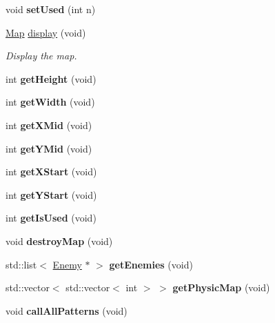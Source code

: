 \begin{DoxyCompactItemize}
\item 
\hypertarget{class_map_a65e629556c23b331cb085e4fdb079e29}{void {\bfseries set\+Used} (int n)}\label{class_map_a65e629556c23b331cb085e4fdb079e29}

\item 
\hyperlink{class_map}{Map} \hyperlink{class_map_a1a6c8bd5dc92c36e7054158d0fcb749b}{display} (void)
\begin{DoxyCompactList}\small\item\em Display the map. \end{DoxyCompactList}\item 
\hypertarget{class_map_af97e5f771e25f1252f252b711609372f}{int {\bfseries get\+Height} (void)}\label{class_map_af97e5f771e25f1252f252b711609372f}

\item 
\hypertarget{class_map_a3afe893c2512081114794b7a90168f9b}{int {\bfseries get\+Width} (void)}\label{class_map_a3afe893c2512081114794b7a90168f9b}

\item 
\hypertarget{class_map_ae46defbf68796588003bc7bd684f57dd}{int {\bfseries get\+X\+Mid} (void)}\label{class_map_ae46defbf68796588003bc7bd684f57dd}

\item 
\hypertarget{class_map_a17cd0dd85f39136eaa6abc65884aed57}{int {\bfseries get\+Y\+Mid} (void)}\label{class_map_a17cd0dd85f39136eaa6abc65884aed57}

\item 
\hypertarget{class_map_a298eab55f9b38b862b20935d9be66a9e}{int {\bfseries get\+X\+Start} (void)}\label{class_map_a298eab55f9b38b862b20935d9be66a9e}

\item 
\hypertarget{class_map_a45102f1eb08ea52920c36c085d77e036}{int {\bfseries get\+Y\+Start} (void)}\label{class_map_a45102f1eb08ea52920c36c085d77e036}

\item 
\hypertarget{class_map_a2f86339d3100c1ecc0fa7574875cfd6d}{int {\bfseries get\+Is\+Used} (void)}\label{class_map_a2f86339d3100c1ecc0fa7574875cfd6d}

\item 
\hypertarget{class_map_a9a2ad750b228f2dc398c13e960663b94}{void {\bfseries destroy\+Map} (void)}\label{class_map_a9a2ad750b228f2dc398c13e960663b94}

\item 
\hypertarget{class_map_a4e17ccc5b0e5f262f31117e139e1e3d5}{std\+::list$<$ \hyperlink{class_enemy}{Enemy} $\ast$ $>$ {\bfseries get\+Enemies} (void)}\label{class_map_a4e17ccc5b0e5f262f31117e139e1e3d5}

\item 
\hypertarget{class_map_a307ec0b3c5b00d708af423173a020763}{std\+::vector$<$ std\+::vector$<$ int $>$ $>$ {\bfseries get\+Physic\+Map} (void)}\label{class_map_a307ec0b3c5b00d708af423173a020763}

\item 
\hypertarget{class_map_a79361391c25d6a515984f56d160dd8fd}{void {\bfseries call\+All\+Patterns} (void)}\label{class_map_a79361391c25d6a515984f56d160dd8fd}

\end{DoxyCompactItemize}


